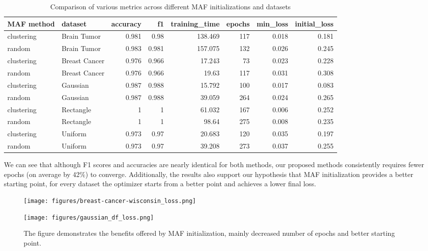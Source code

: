 \documentclass[10pt,a4paper,oneside]{article}
\begin{document}
\begin{table}[H]
    \centering
    \caption{Comparison of various metrics across different MAF initializations and datasets}
    \label{comparison}
    \begin{tabular}{l|l|r|r|r|r|r|r}
    \toprule
    MAF method & dataset & accuracy & f1 & training\_time & epochs & min\_loss & initial\_loss\\
    \midrule
    clustering & Brain Tumor & 0.981 & 0.98 & 138.469 & 117 & 0.018 & 0.181 \\
    random & Brain Tumor & 0.983 & 0.981 & 157.075 & 132 & 0.026 & 0.245 \\
    clustering & Breast Cancer & 0.976 & 0.966 & 17.243 & 73 & 0.023 & 0.228 \\
    random & Breast Cancer & 0.976 & 0.966 & 19.63 & 117 & 0.031 & 0.308 \\
    clustering & Gaussian & 0.987 & 0.988 & 15.792 & 100 & 0.017 & 0.083 \\
    random & Gaussian & 0.987 & 0.988 & 39.059 & 264 & 0.024 & 0.265 \\
    clustering & Rectangle & 1 & 1 & 61.032 & 167 & 0.006 & 0.252  \\
    random & Rectangle & 1 & 1 & 98.64 & 275 & 0.008 & 0.235 \\
    clustering & Uniform & 0.973 & 0.97 & 20.683 & 120 & 0.035 & 0.197  \\
    random & Uniform & 0.973 & 0.97 & 39.208 & 273 & 0.037 & 0.255 \\
        \bottomrule
    \end{tabular}
\end{table}

{\color{red}We can see that although F1 scores and accuracies are nearly identical for both methods, our proposed methods consistently requires fewer epochs (on average by 42$\%$) to converge. Additionally, the results also support our hypothesis that MAF initialization provides a better starting point, for every dataset the optimizer starts from a better point and achieves a lower final loss.}


\FloatBarrier

\begin{figure}[htbp]
    \centering
    \label{talbe-ratios}
    \begin{minipage}{0.49\textwidth}
        \texttt{[image: figures/breast-cancer-wisconsin\_loss.png]} %
    \end{minipage}\hfill
    \begin{minipage}{0.49\textwidth}
        \texttt{[image: figures/gaussian\_df\_loss.png]} %
    \end{minipage}
    \caption{The figure demonstrates the benefits offered by MAF initialization, mainly decreased number of epochs and better starting point.}
    \label{fig:side_by_side}
\end{figure}
\end{document}
